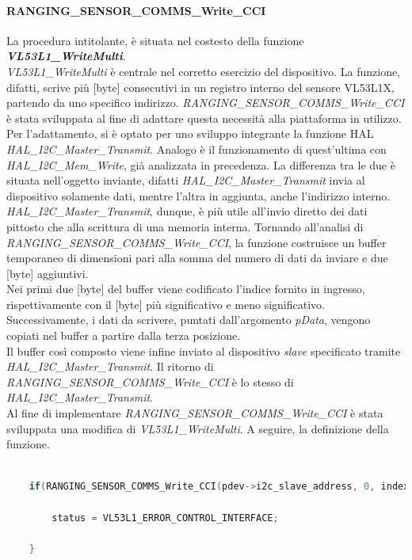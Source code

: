 \documentclass[11pt]{report}
\begin{document}
\paragraph{RANGING\_SENSOR\_COMMS\_Write\_CCI}
La procedura intitolante, è situata nel costesto della funzione \textbf{\textit{VL53L1\_WriteMulti}}.\\
\textit{VL53L1\_WriteMulti} è centrale nel corretto esercizio del dispositivo. La funzione, difatti, scrive più [byte] consecutivi in un registro interno del sensore VL53L1X, partendo da uno specifico indirizzo.
\textit{RANGING\_SENSOR\_COMMS\_Write\_CCI} è stata sviluppata al fine di adattare questa necessità alla piattaforma in utilizzo.\\
Per l'adattamento, si è optato per uno sviluppo integrante la funzione HAL\\\textit{HAL\_I2C\_Master\_Transmit}. Analogo è il funzionamento di quest'ultima con\\\textit{HAL\_I2C\_Mem\_Write}, già analizzata in precedenza.
La differenza tra le due è situata nell'oggetto inviante, difatti \textit{HAL\_I2C\_Master\_Transmit} invia al dispositivo solamente dati, mentre l'altra in aggiunta, anche l'indirizzo interno. \textit{HAL\_I2C\_Master\_Transmit}, dunque, è più utile all'invio diretto dei dati pittosto che alla scrittura di una memoria interna.
Tornando all'analisi di \textit{RANGING\_SENSOR\_COMMS\_Write\_CCI}, la funzione costruisce un buffer temporaneo di dimensioni pari alla somma del numero di dati da inviare e due [byte] aggiuntivi.\\
Nei primi due [byte] del buffer viene codificato l'indice fornito in ingresso, rispettivamente con il [byte] più significativo e meno significativo.\\
Successivamente, i dati da scrivere, puntati dall'argomento \textit{pData}, vengono copiati nel buffer a partire dalla terza posizione.\\
Il buffer così composto viene infine inviato al dispositivo \textit{slave} specificato tramite\\\textit{HAL\_I2C\_Master\_Transmit}.
Il ritorno di \textit{RANGING\_SENSOR\_COMMS\_Write\_CCI} è lo stesso di \textit{HAL\_I2C\_Master\_Transmit}.\\
Al fine di implementare \textit{RANGING\_SENSOR\_COMMS\_Write\_CCI} è stata sviluppata una modifica di \textit{VL53L1\_WriteMulti}.
A seguire, la definizione della funzione.

\begin{lstlisting}[language=Cpp, caption={Dettaglio sull'implementazione di \textit{RANGING\_SENSOR\_COMMS\_Write\_CCI} in \textit{VL53L1\_WriteMulti} }]
    
    if(RANGING_SENSOR_COMMS_Write_CCI(pdev->i2c_slave_address, 0, index+position, pdata+position, data_size) != HAL_OK){
        
        status = VL53L1_ERROR_CONTROL_INTERFACE;

    }

\end{lstlisting}
\end{document}
